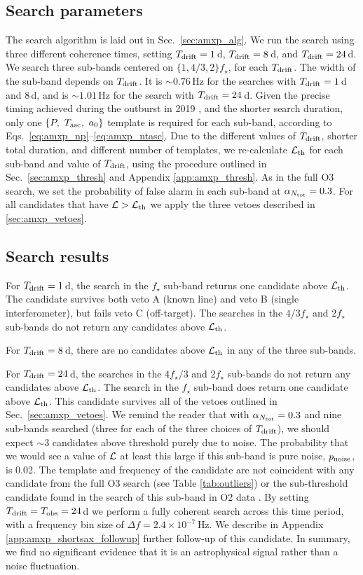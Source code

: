 \subsection{Search parameters}
The search algorithm is laid out in Sec.~\ref{sec:amxp_alg}. We run the search using three different coherence times, setting $T_{\textrm{drift}} = 1\,$d, $T_{\textrm{drift}} = 8\,$d, and $T_{\textrm{drift}} = 24\,$d. We search three sub-bands centered on $\{1, 4/3, 2\}f_\star$, for each $T_{\textrm{drift}}$. The width of the sub-band depends on $T_{\textrm{drift}}$. It is $\sim 0.76\,$Hz for the searches with $T_{\textrm{drift}}=1\,$d and $8\,$d, and is $\sim 1.01\,$Hz for the search with $T_{\textrm{drift}}=24\,$d. Given the precise timing achieved during the outburst in 2019 \cite{Bult2020}, and the shorter search duration, only one $\{P,\ \tasc,\ a_0\}$ template is required for each sub-band, according to Eqs.~\eqref{eq:amxp_np}--\eqref{eq:amxp_ntasc}. Due to the different values of $T_{\textrm{drift}}$, shorter total duration, and different number of templates, we re-calculate $\mathcal{L}_{\rm th}$ for each sub-band and value of $T_{\textrm{drift}}$, using the procedure outlined in Sec.~\ref{sec:amxp_thresh} and Appendix \ref{app:amxp_thresh}. As in the full O3 search, we set the probability of false alarm in each sub-band at $\alpha_{N_{\rm tot}} = 0.3$. For all candidates that have $\mathcal{L} > \mathcal{L}_{\rm th}$ we apply the three vetoes described in \ref{sec:amxp_vetoes}.

\subsection{Search results}
For $T_{\textrm{drift}} = 1\,$d, the search in the $f_\star$ sub-band returns one candidate above $\mathcal{L}_{\rm th}$. The candidate survives both veto A (known line) and veto B (single interferometer), but fails veto C (off-target). The searches in the $4/3f_\star$ and $2f_\star$ sub-bands do not return any candidates above $\mathcal{L}_{\rm th}$.

For $T_{\textrm{drift}} = 8\,$d, there are no candidates above $\mathcal{L}_{\rm th}$ in any of the three sub-bands.

For $T_{\textrm{drift}} = 24\,$d, the searches in the $4 f_\star /3$ and $2f_\star$ sub-bands do not return any candidates above $\mathcal{L}_{\rm th}$. The search in the $f_\star$ sub-band does return one candidate above $\mathcal{L}_{\rm th}$. This candidate survives all of the vetoes outlined in Sec.~\ref{sec:amxp_vetoes}. We remind the reader that with $\alpha_{N_{\rm tot}} = 0.3$ and nine sub-bands searched (three for each of the three choices of $T_{\textrm{drift}}$), we should expect $\sim 3$ candidates above threshold purely due to noise. The probability that we would see a value of $\mathcal{L}$ at least this large if this sub-band is pure noise, $p_{\rm noise}$, is 0.02. The template and frequency of the candidate are not coincident with any candidate from the full O3 search (see Table \ref{tab:outliers}) or the sub-threshold candidate found in the search of this sub-band in O2 data \cite{Middleton2020}. By setting $T_{\textrm{drift}} = T_{\rm obs} = 24\,$d we perform a fully coherent search across this time period, with a frequency bin size of $\Delta f = 2.4\times10^{-7}\,$Hz. We describe in Appendix \ref{app:amxp_shortsax_followup} further follow-up of this candidate. In summary, we find no significant evidence that it is an astrophysical signal rather than a noise fluctuation.

